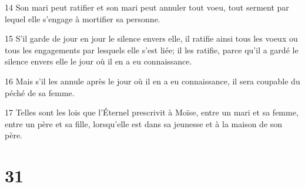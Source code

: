 \par 14 Son mari peut ratifier et son mari peut annuler tout voeu, tout serment par lequel elle s'engage à mortifier sa personne.
\par 15 S'il garde de jour en jour le silence envers elle, il ratifie ainsi tous les voeux ou tous les engagements par lesquels elle s'est liée; il les ratifie, parce qu'il a gardé le silence envers elle le jour où il en a eu connaissance.
\par 16 Mais s'il les annule après le jour où il en a eu connaissance, il sera coupable du péché de sa femme.
\par 17 Telles sont les lois que l'Éternel prescrivit à Moïse, entre un mari et sa femme, entre un père et sa fille, lorsqu'elle est dans sa jeunesse et à la maison de son père.

\chapter{31}

